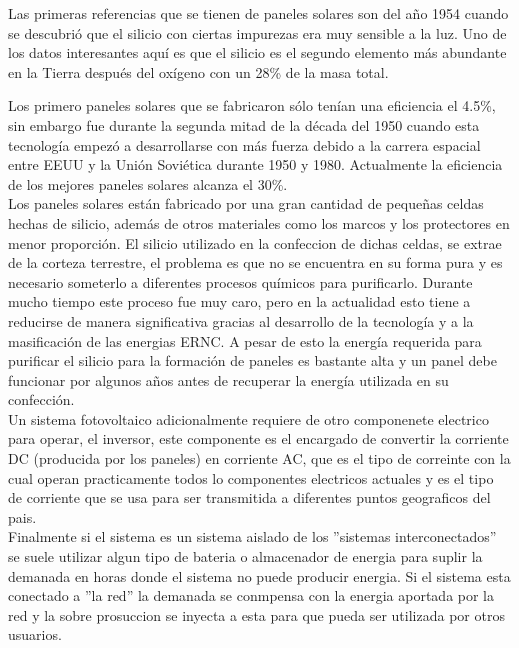 Las primeras referencias que se tienen de paneles solares son del año 1954 cuando se descubrió que el silicio con ciertas impurezas era muy sensible a la luz. Uno de los datos interesantes aquí es que el silicio es el segundo elemento más abundante en la Tierra después del oxígeno con un 28\% de la masa total.

Los primero paneles solares que se fabricaron sólo tenían una eficiencia el 4.5\%, sin embargo fue durante la segunda mitad de la década del 1950 cuando esta tecnología empezó a desarrollarse con más fuerza debido a la carrera espacial entre EEUU y la Unión Soviética durante 1950 y 1980. Actualmente la eficiencia de los mejores paneles solares alcanza el 30\%.\\

Los paneles solares están fabricado por una gran cantidad de pequeñas celdas hechas de silicio, además de otros materiales como los marcos y los protectores en menor proporción. El silicio utilizado en la confeccion de dichas celdas, se extrae de la corteza terrestre, el problema es que no se encuentra en su forma pura y es necesario someterlo a diferentes procesos químicos para purificarlo. Durante mucho tiempo este proceso fue muy caro, pero en la actualidad esto tiene a reducirse de manera significativa gracias al desarrollo de la tecnología y a la masificación de las energias ERNC. A pesar de esto la energía requerida para purificar el silicio para la formación de paneles es bastante alta y un panel debe funcionar por algunos años antes de recuperar la energía utilizada en su confección.\\

Un sistema fotovoltaico adicionalmente requiere de otro componenete electrico para operar, el inversor, este componente es el encargado de convertir la corriente DC (producida por los paneles) en corriente AC, que es el tipo de correinte con la cual operan practicamente todos lo componentes electricos actuales y es el tipo de corriente que se usa para ser transmitida a diferentes puntos geograficos del pais.\\

Finalmente si el sistema es un sistema aislado de los ''sistemas interconectados'' se suele utilizar algun tipo de bateria o almacenador de energia para suplir la demanada en horas donde el sistema no puede producir energia. Si el sistema esta conectado a ''la red'' la demanada se conmpensa con la energia aportada por la red y la sobre prosuccion se inyecta a esta para que pueda ser utilizada por otros usuarios.

